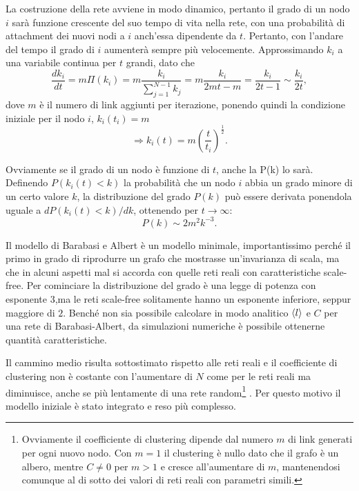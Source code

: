 La costruzione della rete avviene in modo dinamico, pertanto il grado di un nodo $i$ sarà funzione crescente del suo tempo di vita nella rete, con una probabilità di attachment dei nuovi nodi a $i$ anch'essa dipendente da $t$. Pertanto, con l'andare del tempo il grado di $i$ aumenterà sempre più velocemente. Approssimando $k_i$ a una variabile continua per $t$ grandi, dato che 
\[\frac{dk_i}{dt} = m \Pi (k_i) = m \frac{k_i}{\sum_{j=1}^{N-1} k_j} = m \frac{k_i}{2mt - m} = \frac{k_i}{2t - 1} \sim \frac{k_i}{2t},\]
dove $m$ è il numero di link aggiunti per iterazione, ponendo quindi la condizione iniziale per il nodo $i$, $k_i(t_i) = m$
\[ \Rightarrow k_i(t) = m \left(\frac{t}{t_i}\right)^\frac{1}{2}. \]

Ovviamente se il grado di un nodo è funzione di $t$, anche la P(k) lo sarà. Definendo $P(k_i(t)<k)$ la probabilità che un nodo $i$ abbia un grado minore di un certo valore $k$, la distribuzione del grado $P(k)$ può essere derivata ponendola uguale a $dP(k_i(t)<k)/dk$, ottenendo per $t\rightarrow \infty$:
\[ P(k)\sim 2m^2 k^{-3}. \]


Il modello di Barabasi e Albert è un modello minimale, importantissimo perché il primo in grado di riprodurre un grafo che mostrasse un'invarianza di scala, ma che in alcuni aspetti mal si accorda con quelle reti reali con caratteristiche scale-free. Per cominciare la distribuzione del grado è una legge di potenza con esponente $3$,ma le reti scale-free solitamente hanno un esponente inferiore, seppur maggiore di $2$. Benché non sia possibile calcolare in modo analitico $\braket{l}$ e $C$ per una rete di Barabasi-Albert, da simulazioni numeriche è possibile ottenerne quantità caratteristiche. 

Il cammino medio risulta sottostimato rispetto alle reti reali e il coefficiente di clustering non è costante con l'aumentare di $N$ come per le reti reali ma diminuisce, anche se più lentamente di una rete random\footnote{Ovviamente il coefficiente di clustering dipende dal numero $m$ di link generati per ogni nuovo nodo. Con $m = 1$ il clustering \`e nullo dato che il grafo \`e un albero, mentre $C \neq 0$ per $m>1$ e cresce all'aumentare di $m$, mantenendosi comunque al di sotto dei valori di reti reali con parametri simili.} \parencite{Barbalbert2002}. Per questo motivo il modello iniziale è stato integrato e reso più complesso.  


